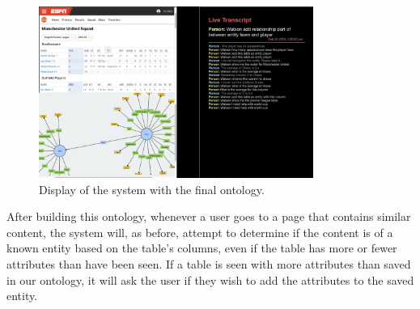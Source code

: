 \begin{figure}[hbtp]
\centering
\includegraphics[width=0.8\textwidth]{chapters/03_reagent/figures/use_case_3.png}
\caption{Display of the system with the final ontology.}
\label{fig:use_case_3}
\end{figure}

After building this ontology, whenever a user goes to a page that contains
similar content, the system will, as before, attempt to determine if the
content is of a known entity based on the table's columns, even if
the table has more or fewer attributes than have been seen. If a table is seen
with more attributes than saved in our ontology, it will ask the user if they
wish to add the attributes to the saved entity.
